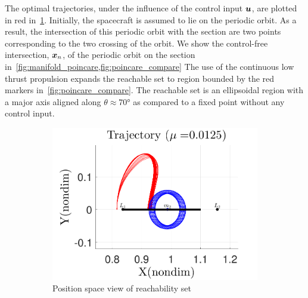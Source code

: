 \documentclass[smallcondensed]{svjour3}
\begin{document}
The optimal trajectories, under the influence of the control input \( \bm{u} \), are plotted in red in~\cref{fig:reach_trajectory}.
Initially, the spacecraft is assumed to lie on the periodic orbit.
As a result, the intersection of this periodic orbit with the \Poincare section are two points corresponding to the two crossing of the orbit.
We show the control-free intersection, \( \bm{x}_n \), of the periodic orbit on the \Poincare section in~\cref{fig:manifold_poincare,fig:poincare_compare}
The use of the continuous low thrust propulsion expands the reachable set to region bounded by the red markers in~\cref{fig:poincare_compare}.
The reachable set is an ellipsoidal region with a major axis aligned along \( \theta \approx \ang{70} \) as compared to a fixed point without any control input.
\begin{figure} 
        \centering 
        \begin{subfigure}[htbp]{0.5\textwidth} 
                \includegraphics[width=\textwidth]{reach_trajectory} 
                \caption{Position space view of reachability set} \label{fig:reach_trajectory} 
        \end{subfigure}~ %
        \begin{subfigure}[htbp]{0.5\textwidth} 

\end{subfigure}
\end{figure}
\end{document}
